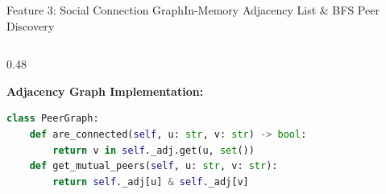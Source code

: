 \documentclass[aspectratio=169,10pt]{beamer}
\begin{document}
\begin{frame}[fragile,t]{Feature 3: Social Connection Graph}{In-Memory Adjacency List \& BFS Peer Discovery}
\begin{columns}[t]
\begin{column}{0.48\textwidth}
\begin{itemize}
      \end{itemize}
      \vspace{0.1cm}
      {\fontsize{8.0}{10.0}\selectfont\textbf{\textcolor{KoinexaRed}{Adjacency Graph Implementation:}}}
\begin{lstlisting}[language=Python]
class PeerGraph:
    def are_connected(self, u: str, v: str) -> bool:
        return v in self._adj.get(u, set())
    def get_mutual_peers(self, u: str, v: str):
        return self._adj[u] & self._adj[v]
\end{lstlisting}
    \end{column}
  \end{columns}
\end{frame}

\end{document}
